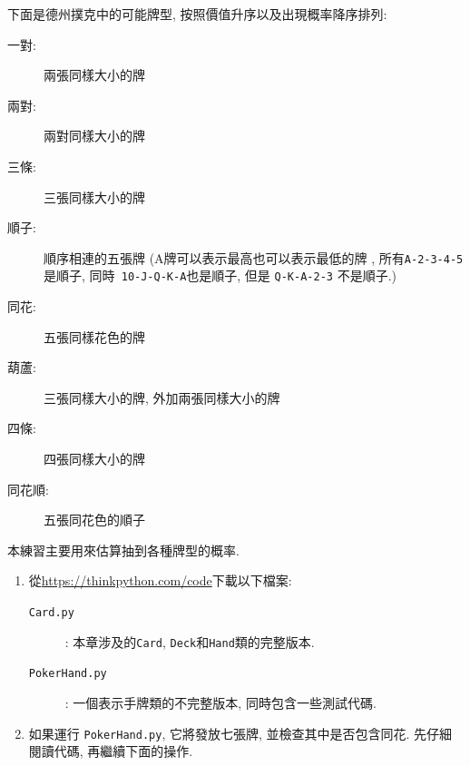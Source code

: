 \documentclass[10pt]{book}
\begin{document}
\begin{exercise}
\label{poker}
下面是德州撲克中的可能牌型, 按照價值升序以及出現概率降序排列:

\begin{description}

\item[一對:] 兩張同樣大小的牌
\vspace{-0.05in}

\item[兩對:] 兩對同樣大小的牌
\vspace{-0.05in}

\item[三條:] 三張同樣大小的牌
\vspace{-0.05in}

\item[順子:] 順序相連的五張牌 (A牌可以表示最高也可以表示最低的牌
, 所有{\tt A-2-3-4-5}是順子, 同時{\tt
10-J-Q-K-A}也是順子, 但是 {\tt Q-K-A-2-3} 不是順子.)
\vspace{-0.05in}

\item[同花:] 五張同樣花色的牌
\vspace{-0.05in}

\item[葫蘆:] 三張同樣大小的牌, 外加兩張同樣大小的牌
\vspace{-0.05in}

\item[四條:] 四張同樣大小的牌
\vspace{-0.05in}

\item[同花順:] 五張同花色的順子
\vspace{-0.05in}

\end{description}
%
本練習主要用來估算抽到各種牌型的概率.

\begin{enumerate}

\item 從\url{https://thinkpython.com/code}下載以下檔案:

\begin{description}

\item[{\tt Card.py}]: 本章涉及的{\tt Card},
{\tt Deck}和{\tt Hand}類的完整版本. 

\item[{\tt PokerHand.py}]: 一個表示手牌類的不完整版本, 同時包含一些測試代碼.

\end{description}
%
\item 如果運行 {\tt PokerHand.py}, 它將發放七張牌, 
並檢查其中是否包含同花. 先仔細閱讀代碼, 再繼續下面的操作. 


\end{enumerate}
\end{exercise}
\end{document}

